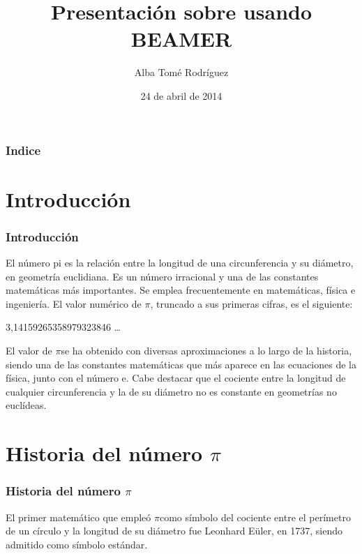 \documentclass{beamer}
\title[Presentación con Beamer]{Presentación sobre \PI usando BEAMER}
\author[Alba]{Alba Tomé Rodríguez}
\institute{ULL}
\date[24-04-2014]{24 de abril de 2014}
\newcommand{\PI}{{$\pi$}}
\begin{document}
\begin{frame}
\titlepage
\end{frame}

\begin{frame}
\frametitle{Indice}
\tableofcontents[pausesections]
\end{frame}

\section{Introducción}

\begin{frame}
\frametitle{Introducción}

El número pi es la relación entre la longitud de una circunferencia y su diámetro, en geometría euclidiana. Es un número irracional y una de las constantes matemáticas más importantes. Se emplea frecuentemente en matemáticas, física e ingeniería. El valor numérico de \PI, truncado a sus primeras cifras, es el siguiente:

\centerline{3,14159265358979323846 \dots}

El valor de \PI se ha obtenido con diversas aproximaciones a lo largo de la historia, siendo una de las constantes matemáticas que más aparece en las ecuaciones de la física, junto con el número e. Cabe destacar que el cociente entre la longitud de cualquier circunferencia y la de su diámetro no es constante en geometrías no euclídeas.


\end{frame}

\section{Historia del número \PI}
\begin{frame}
\frametitle{Historia del número \PI}

El primer matemático que empleó \PI como símbolo del cociente entre el perímetro de un círculo y la longitud de su diámetro fue Leonhard Eüler, en 1737, siendo admitido como símbolo estándar.
\end{frame}
\end{document}
